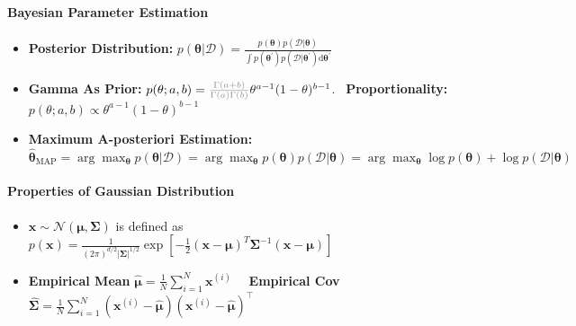 \documentclass[10pt]{article}
\begin{document}
\paragraph{Bayesian Parameter Estimation}
\begin{itemize}
    \setlength\itemsep{-0.45em}
    \item \textbf{Posterior Distribution:} $p(\boldsymbol{\theta} | \mathcal{D})=\frac{p(\boldsymbol{\theta}) p(\mathcal{D} | \boldsymbol{\theta})}{\int p\left(\boldsymbol{\theta}^{\prime}\right) p\left(\mathcal{D} | \boldsymbol{\theta}^{\prime}\right) \mathrm{d} \boldsymbol{\theta}^{\prime}}$
    \item \textbf{Gamma As Prior:} $p(\theta ; a, b)= \color{Gray}\frac{\Gamma(a+b)}{\Gamma(a) \Gamma(b)} \color{Black}\theta^{a-1}(1-\theta)^{b-1}$.~ \textbf{Proportionality:} $p(\theta ; a, b) \propto \theta^{a-1}(1-\theta)^{b-1}$
    \item \textbf{Maximum A-posteriori Estimation:} $\hat{\boldsymbol{\theta}}_{\mathrm{MAP}}=\arg \max _{\boldsymbol{\theta}} p(\boldsymbol{\theta} | \mathcal{D}) =\arg \max _{\boldsymbol{\theta}} p(\boldsymbol{\theta}) p(\mathcal{D} | \boldsymbol{\theta}) = \arg \max _{\boldsymbol{\theta}} \log p(\boldsymbol{\theta})+\log p(\mathcal{D} | \boldsymbol{\theta})$
\end{itemize}

\paragraph{Properties of Gaussian Distribution}
\begin{itemize}
    \setlength\itemsep{-0.65em}
    \item $\mathbf{x} \sim \mathcal{N}(\boldsymbol{\mu}, \mathbf{\Sigma})$ is defined as $p(\mathbf{x})=\frac{1}{(2 \pi)^{d / 2}|\mathbf{\Sigma}|^{1 / 2}} \exp \left[-\frac{1}{2}(\mathbf{x}-\boldsymbol{\mu})^{T} \mathbf{\Sigma}^{-1}(\mathbf{x}-\boldsymbol{\mu})\right]$
    \item \textbf{Empirical Mean} $\hat{\boldsymbol{\mu}}=\frac{1}{N} \sum_{i=1}^{N} \mathbf{x}^{(i)}$~~ \textbf{Empirical Cov}~ $\hat{\mathbf{\Sigma}}=\frac{1}{N} \sum_{i=1}^{N}\left(\mathbf{x}^{(i)}-\hat{\boldsymbol{\mu}}\right)\left(\mathbf{x}^{(i)}-\hat{\boldsymbol{\mu}}\right)^{\top}$
\end{itemize}
\end{document}
